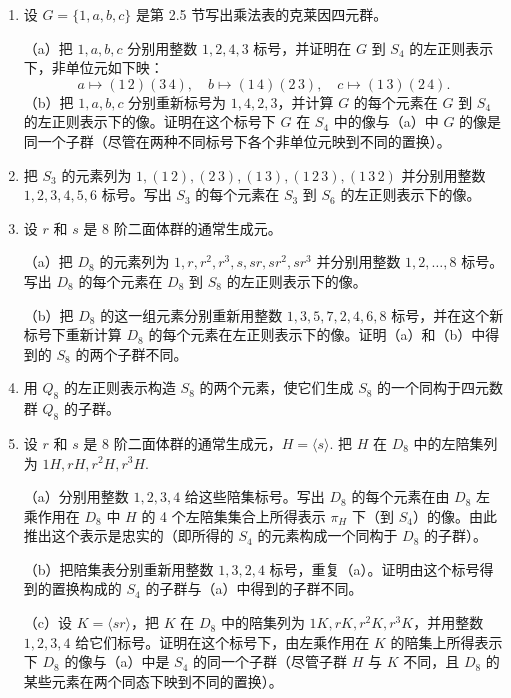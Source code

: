 \begin{enumerate}
\item 设 \(G = \{1, a, b, c\}\) 是第 2.5 节写出乘法表的克莱因四元群。

（a）把 \(1, a, b, c\) 分别用整数 \(1, 2, 4, 3\) 标号，并证明在 \(G\) 到 \(S_4\) 的左正则表示下，非单位元如下映：
\[
a \mapsto (1\,2)(3\,4), \quad b \mapsto (1\,4)(2\,3), \quad c \mapsto (1\,3)(2\,4).
\]
（b）把 \(1, a, b, c\) 分别重新标号为 \(1, 4, 2, 3\)，并计算 \(G\) 的每个元素在 \(G\) 到 \(S_4\) 的左正则表示下的像。证明在这个标号下 \(G\) 在 \(S_4\) 中的像与（a）中 \(G\) 的像是同一个子群（尽管在两种不同标号下各个非单位元映到不同的置换）。

\item 把 \(S_3\) 的元素列为 \(1, (1\,2), (2\,3), (1\,3), (1\,2\,3), (1\,3\,2)\) 并分别用整数 \(1, 2, 3, 4, 5, 6\) 标号。写出 \(S_3\) 的每个元素在 \(S_3\) 到 \(S_6\) 的左正则表示下的像。

\item 设 \(r\) 和 \(s\) 是 8 阶二面体群的通常生成元。

（a）把 \(D_8\) 的元素列为 \(1, r, r^2, r^3, s, sr, sr^2, sr^3\) 并分别用整数 \(1, 2, \ldots, 8\) 标号。写出 \(D_8\) 的每个元素在 \(D_8\) 到 \(S_8\) 的左正则表示下的像。

（b）把 \(D_8\) 的这一组元素分别重新用整数 \(1, 3, 5, 7, 2, 4, 6, 8\) 标号，并在这个新标号下重新计算 \(D_8\) 的每个元素在左正则表示下的像。证明（a）和（b）中得到的 \(S_8\) 的两个子群不同。

\item 用 \(Q_8\) 的左正则表示构造 \(S_8\) 的两个元素，使它们生成 \(S_8\) 的一个同构于四元数群 \(Q_8\) 的子群。

\item 设 \(r\) 和 \(s\) 是 8 阶二面体群的通常生成元，\(H = \langle s \rangle\). 把 \(H\) 在 \(D_8\) 中的左陪集列为 \(1H, rH, r^2H, r^3H\).

（a）分别用整数 \(1, 2, 3, 4\) 给这些陪集标号。写出 \(D_8\) 的每个元素在由 \(D_8\) 左乘作用在 \(D_8\) 中 \(H\) 的 4 个左陪集集合上所得表示 \(\pi_H\) 下（到 \(S_4\)）的像。由此推出这个表示是忠实的（即所得的 \(S_4\) 的元素构成一个同构于 \(D_8\) 的子群）。

（b）把陪集表分别重新用整数 \(1, 3, 2, 4\) 标号，重复（a）。证明由这个标号得到的置换构成的 \(S_4\) 的子群与（a）中得到的子群不同。

（c）设 \(K = \langle sr \rangle\)，把 \(K\) 在 \(D_8\) 中的陪集列为 \(1K, rK, r^2K, r^3K\)，并用整数 \(1, 2, 3, 4\) 给它们标号。证明在这个标号下，由左乘作用在 \(K\) 的陪集上所得表示下 \(D_8\) 的像与（a）中是 \(S_4\) 的同一个子群（尽管子群 \(H\) 与 \(K\) 不同，且 \(D_8\) 的某些元素在两个同态下映到不同的置换）。


\end{enumerate}
